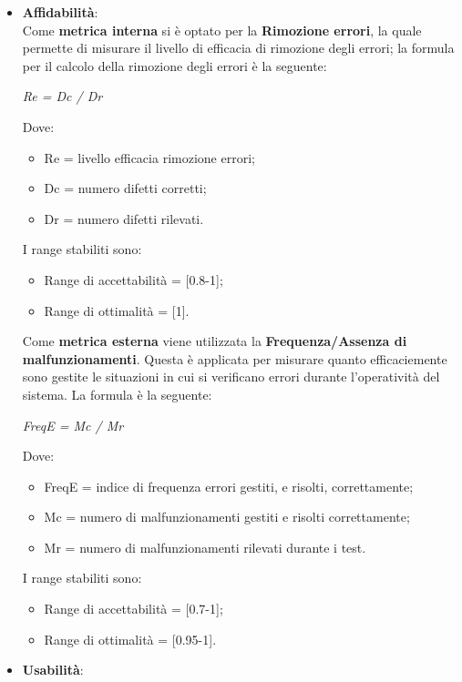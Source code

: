 \begin{itemize}
\begin{itemize}
      \end{itemize}
      \item \textbf{Affidabilità}:\\
      Come \textbf{metrica interna} si è optato per la \textbf{Rimozione errori},
      la quale permette di misurare il livello di efficacia di rimozione degli errori;
      la formula per il calcolo della rimozione degli errori è la seguente:
      \begin{center}
        \emph{Re = Dc / Dr}
      \end{center}
      Dove:
      \begin{itemize}
        \item Re = livello efficacia rimozione errori;
        \item Dc = numero difetti corretti;
        \item Dr = numero difetti rilevati.
      \end{itemize}
      I range stabiliti sono:
      \begin{itemize}
        \item Range di accettabilità = [0.8-1];
        \item Range di ottimalità = [1].
      \end{itemize}
      Come \textbf{metrica esterna} viene utilizzata la \textbf{Frequenza/Assenza di malfunzionamenti}.
      Questa è applicata per misurare quanto efficaciemente sono gestite le situazioni in cui si verificano errori durante l'operatività del sistema.
      La formula è la seguente:
      \begin{center}
        \emph{FreqE = Mc / Mr}
      \end{center}
      Dove:
      \begin{itemize}
        \item FreqE = indice di frequenza errori gestiti, e risolti, correttamente;
        \item Mc = numero di malfunzionamenti gestiti e risolti correttamente;
        \item Mr = numero di malfunzionamenti rilevati durante i test.
      \end{itemize}
      I range stabiliti sono:
      \begin{itemize}
        \item Range di accettabilità = [0.7-1];
        \item Range di ottimalità = [0.95-1].
      \end{itemize}
      \item \textbf{Usabilità}:\\

\end{itemize}
